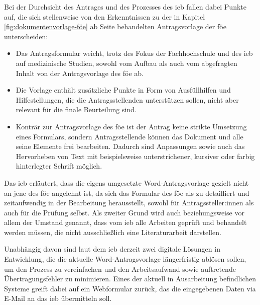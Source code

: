 \documentclass[a4paper,12pt,twoside]{scrreprt}
\begin{document}
\medskip

Bei der Durchsicht des Antrages und des Prozesses des \ac{ieb} fallen dabei Punkte auf, die sich stellenweise von den Erkenntnissen zu der in Kapitel \ref{fig:dokumentenvorlage-föe} ab Seite \pageref{sub-sec:vorlage-föe} behandelten Antragsvorlage der \ac{föe} unterscheiden:
\begin{itemize}
    \item Das Antragsformular weicht, trotz des Fokus der Fachhochschule und des \ac{ieb} auf medizinische Studien, sowohl vom Aufbau als auch vom abgefragten Inhalt von der Antragsvorlage des \ac{föe} ab.
    \item Die Vorlage enthält zusätzliche Punkte in Form von Ausfüllhilfen und Hilfestellungen, die die Antragsstellenden unterstützen sollen, nicht aber relevant für die finale Beurteilung sind.
    \item Konträr zur Antragsvorlage des \ac{föe} ist der Antrag keine strikte Umsetzung eines Formulars, sondern Antragsstellende können das Dokument und alle seine Elemente frei bearbeiten. Dadurch sind Anpassungen sowie auch das Hervorheben von Text mit beispielsweise unterstrichener, kursiver oder farbig hinterlegter Schrift möglich.
\end{itemize}

Das \ac{ieb} erläutert, dass die eigens umgesetzte Word-Antragsvorlage gezielt nicht an jene des \ac{föe} angelehnt ist, da sich das Formular des \ac{föe} als zu detailliert und zeitaufwendig in der Bearbeitung herausstellt, sowohl für Antragssteller:innen als auch für die Prüfung selbst. Als zweiter Grund wird auch beziehungsweise vor allem der Umstand genannt, dass vom \ac{ieb} alle Arbeiten geprüft und behandelt werden müssen, die nicht ausschließlich eine Literaturarbeit darstellen. \cite{rosendahl-huber_extern-erfahrungen_2023}

Unabhängig davon sind laut dem \ac{ieb} derzeit zwei digitale Lösungen in Entwicklung, die die aktuelle Word-Antragsvorlage längerfristig ablösen sollen, um den Prozess zu vereinfachen und den Arbeitsaufwand sowie auftretende Übertragungsfehler zu minimieren. Eines der aktuell in Ausarbeitung befindlichen Systeme greift dabei auf ein Webformular zurück, das die eingegebenen Daten via E-Mail an das \ac{ieb} übermitteln soll. \cite{rosendahl-huber_extern-erfahrungen_2023}
\end{document}
